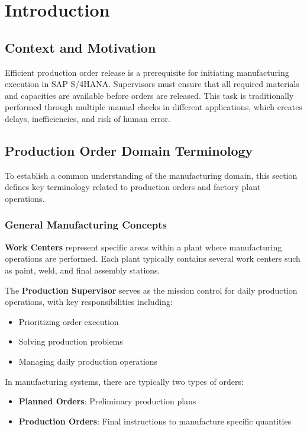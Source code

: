 \chapter{Introduction}
\label{sec:Introduction}

\section{Context and Motivation}
Efficient production order release is a prerequisite for initiating manufacturing execution in SAP S/4HANA. Supervisors must ensure that all required materials and capacities are available before orders are released. This task is traditionally performed through multiple manual checks in different applications, which creates delays, inefficiencies, and risk of human error.

\section{Production Order Domain Terminology}
\label{sec:Terminology}

To establish a common understanding of the manufacturing domain, this section defines key terminology related to production orders and factory plant operations.

\subsection{General Manufacturing Concepts}

\textbf{Work Centers} represent specific areas within a plant where manufacturing operations are performed. Each plant typically contains several work centers such as paint, weld, and final assembly stations.

The \textbf{Production Supervisor} serves as the mission control for daily production operations, with key responsibilities including:
\begin{itemize}
    \item Prioritizing order execution
    \item Solving production problems
    \item Managing daily production operations
\end{itemize}

In manufacturing systems, there are typically two types of orders:
\begin{itemize}
    \item \textbf{Planned Orders}: Preliminary production plans
    \item \textbf{Production Orders}: Final instructions to manufacture specific quantities
\end{itemize}

